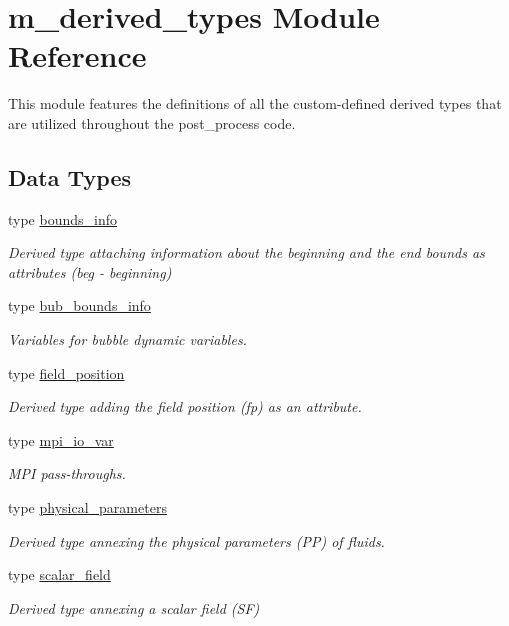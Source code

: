 \hypertarget{namespacem__derived__types}{}\section{m\+\_\+derived\+\_\+types Module Reference}
\label{namespacem__derived__types}


This module features the definitions of all the custom-\/defined derived types that are utilized throughout the post\+\_\+process code.  


\subsection*{Data Types}
\begin{DoxyCompactItemize}
\item 
type \hyperlink{structm__derived__types_1_1bounds__info}{bounds\+\_\+info}
\begin{DoxyCompactList}\small\item\em Derived type attaching information about the beginning and the end bounds as attributes (beg -\/ beginning) \end{DoxyCompactList}\item 
type \hyperlink{structm__derived__types_1_1bub__bounds__info}{bub\+\_\+bounds\+\_\+info}
\begin{DoxyCompactList}\small\item\em Variables for bubble dynamic variables. \end{DoxyCompactList}\item 
type \hyperlink{structm__derived__types_1_1field__position}{field\+\_\+position}
\begin{DoxyCompactList}\small\item\em Derived type adding the field position (fp) as an attribute. \end{DoxyCompactList}\item 
type \hyperlink{structm__derived__types_1_1mpi__io__var}{mpi\+\_\+io\+\_\+var}
\begin{DoxyCompactList}\small\item\em M\+PI pass-\/throughs. \end{DoxyCompactList}\item 
type \hyperlink{structm__derived__types_1_1physical__parameters}{physical\+\_\+parameters}
\begin{DoxyCompactList}\small\item\em Derived type annexing the physical parameters (PP) of fluids. \end{DoxyCompactList}\item 
type \hyperlink{structm__derived__types_1_1scalar__field}{scalar\+\_\+field}
\begin{DoxyCompactList}\small\item\em Derived type annexing a scalar field (SF) \end{DoxyCompactList}\end{DoxyCompactItemize}
